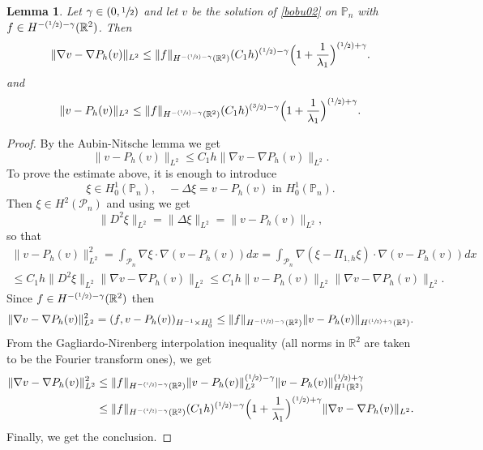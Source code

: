 \documentclass[JEP,XML,SOM,Unicode,ThmDefs,NoFloatCountersInSection,published]{cedram}
\newcommand{\Psfrac}[2]{(\sfrac{#1}{#2})}
\theoremstyle{plain}
\newtheorem{lemma}[thm]{Lemma}
\theoremstyle{definition}
\let\Bbb\mathbb
\def\R{\mathbb{R}}
\begin{document}
\begin{lemma}\label{bobu36.l}
Let $\gamma \in (0, \sfrac 12)$ and let $v$ be the solution of \eqref{bobu02} on $\Bbb P_n$ with $f \in H^{-\Psfrac 12 -\gamma} (\R^2)$. Then
\begin{equation}\label{bobu36}
\|\nabla v- \nabla P_h(v)\|_{L^2} \le \|f\|_{H^{-\Psfrac 12 -\gamma} (\R^2)} (C_1 h)^{\Psfrac 12 -\gamma}\Bigl(1+\frac {1}{\lambda_1}\Bigr)^{\Psfrac 12 +\gamma}. \end{equation}
and
\begin{equation}\label{bobu36.2}
\| v- P_h(v)\|_{L^2} \le \|f\|_{H^{-\Psfrac 12 -\gamma} (\R^2)} (C_1 h)^{\Psfrac 32 -\gamma}\Bigl(1+\frac {1}{\lambda_1}\Bigr)^{\Psfrac 12 +\gamma}. \end{equation}
\end{lemma}
\begin{proof}
By the Aubin-Nitsche lemma \cite[p.\,136]{CiarletBook} we get
\[
\|v-P_h(v)\|_{L^2} \le C_1h \|\nabla v-\nabla P_h(v)\|_{L^2}.
\]
To prove the estimate above, it is enough to introduce
\[
\xi \in H^1_0(\Bbb P_n),\quad -\Delta \xi = v-P_h(v) \mbox{ in } H^1_0(\Bbb P_n).
\]
Then $\xi \in H^2(\mathcal P_n)$ and using \cite[Th.\,4.3.1.4]{grisvard} we get
\[
\|D^2 \xi\|_{L^2} = \|\Delta \xi\|_{L^2} = \|v-P_h(v)\|_{L^2},
\]
so that
\vspace*{-5pt}
\begin{multline*}
\|v-P_h(v)\|_{L^2}^2 = \int_{\mathcal P_n} \nabla \xi\cdot \nabla (v-P_h(v)) dx = \int_{\mathcal P_n} \nabla (\xi-\Pi_{1,h} \xi)\cdot \nabla (v-P_h(v)) dx\\
\le C_1h \|D^2 \xi\|_{L^2} \|\nabla v-\nabla P_h(v) \|_{L^2}\le C_1h \|v-P_h(v) \|_{L^2} \|\nabla v-\nabla P_h(v) \|_{L^2}.
\end{multline*}
Since $f \in H^{-\Psfrac 12 -\gamma} (\R^2)$ then
\[
\|\nabla v-\nabla P_h(v)\|_{L^2}^2= (f, v-P_h(v))_{H^{-1}\times H^1_0} \le \|f\|_{H^{-\Psfrac 12 -\gamma} (\R^2)}\|v-P_h(v)\|_{H^{\Psfrac 12 +\gamma }(\R^2)}.
\]
From the Gagliardo-Nirenberg interpolation inequality (all norms in $\R^2$ are taken to be the Fourier transform ones), we get
\begin{align*}\|\nabla v-\nabla P_h(v)\|_{L^2}^2 & \le \|f\|_{H^{-\Psfrac 12 -\gamma} (\R^2)}\|v-P_h(v)\|_{L^2}^{\Psfrac 12 -\gamma}\|v-P_h(v) \|_{H^1(\R^2)}^{\Psfrac 12 +\gamma} \\
& \le \|f\|_{H^{-\Psfrac 12 -\gamma} (\R^2)} (C_1 h)^{\Psfrac 12 -\gamma}\Bigl(1+\frac {1}{\lambda_1}\Bigr)^{\Psfrac 12 +\gamma} \|\nabla v-\nabla P_h(v)\|_{L^2}.
\end{align*}
Finally, we get the conclusion.
\end{proof}
\end{document}

